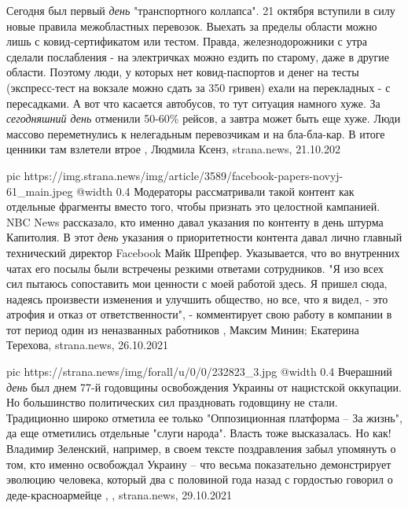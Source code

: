 Сегодня был первый \emph{день} "транспортного коллапса". 21 октября вступили в силу
новые правила межобластных перевозок. Выехать за пределы области можно лишь с
ковид-сертификатом или тестом. Правда, железнодорожники с утра сделали
послабления - на электричках можно ездить по старому, даже в другие области.
Поэтому люди, у которых нет ковид-паспортов и денег на тесты (экспресс-тест на
вокзале можно сдать за 350 гривен) ехали на перекладных - с пересадками.  А вот
что касается автобусов, то тут ситуация намного хуже. За \emph{сегодняшний день}
отменили 50-60\% рейсов, а завтра может быть еще хуже. Люди массово
переметнулись к нелегадьным перевозчикам и на бла-бла-кар. В итоге ценники там
взлетели втрое
, Людмила Ксенз, strana.news, 21.10.202

\ifcmt
  pic https://img.strana.news/img/article/3589/facebook-papers-novyj-61_main.jpeg
  @width 0.4
\fi
Модераторы рассматривали такой контент как отдельные фрагменты вместо того,
чтобы признать это целостной кампанией.  NBC News рассказало, кто именно давал
указания по контенту в день штурма Капитолия.  В этот \emph{день} указания о
приоритетности контента давал лично главный технический директор Facebook Майк
Шрепфер. Указывается, что во внутренних чатах его посылы были встречены резкими
ответами сотрудников.  "Я изо всех сил пытаюсь сопоставить мои ценности с моей
работой здесь. Я пришел сюда, надеясь произвести изменения и улучшить общество,
но все, что я видел, - это атрофия и отказ от ответственности", - комментирует
свою работу в компании в тот период один из неназванных работников
, 
Максим Минин; Екатерина Терехова, strana.news, 26.10.2021

\ifcmt
  pic https://strana.news/img/forall/u/0/0/232823_3.jpg
  @width 0.4
\fi
Вчерашний \emph{день} был днем 77-й годовщины освобождения Украины от нацистской
оккупации. Но большинство политических сил праздновать годовщину не стали.
Традиционно широко отметила ее только "Оппозиционная платформа – За жизнь", да
еще отметились отдельные "слуги народа".  Власть тоже высказалась. Но как!
Владимир Зеленский, например, в своем тексте поздравления забыл упомянуть о
том, кто именно освобождал Украину – что весьма показательно демонстрирует
эволюцию человека, который два с половиной года назад с гордостью говорил о
деде-красноармейце
, 
, strana.news, 29.10.2021
